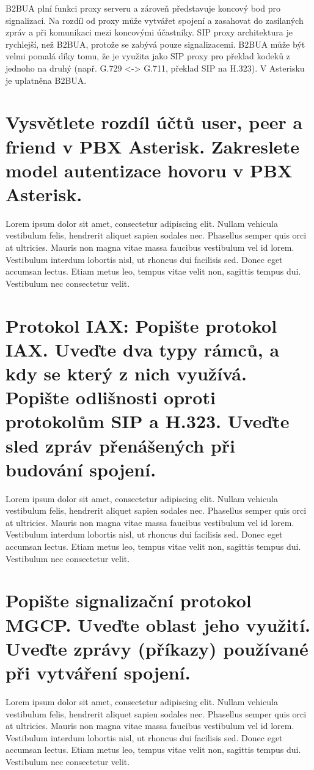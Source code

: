B2BUA plní funkci proxy serveru a zároveň představuje koncový bod pro signalizaci. Na rozdíl od proxy může vytvářet spojení a zasahovat do zasílaných zpráv a při komunikaci mezi koncovými účastníky. SIP proxy architektura je rychlejší, než B2BUA, protože se zabývá pouze signalizacemi. B2BUA může být velmi pomalá díky tomu, že je využita jako SIP proxy pro překlad kodeků z jednoho na druhý (např. G.729 <-> G.711, překlad SIP na H.323). V Asterisku je uplatněna B2BUA.

\section{Vysvětlete rozdíl účtů user, peer a friend v PBX Asterisk. Zakreslete model autentizace hovoru v PBX Asterisk.}

Lorem ipsum dolor sit amet, consectetur adipiscing elit. Nullam vehicula vestibulum felis, hendrerit aliquet sapien sodales nec. Phasellus semper quis orci at ultricies. Mauris non magna vitae massa faucibus vestibulum vel id lorem. Vestibulum interdum lobortis nisl, ut rhoncus dui facilisis sed. Donec eget accumsan lectus. Etiam metus leo, tempus vitae velit non, sagittis tempus dui. Vestibulum nec consectetur velit.

\section{Protokol IAX: Popište protokol IAX. Uveďte dva typy rámců, a kdy se který z nich využívá. Popište odlišnosti oproti protokolům SIP a H.323. Uveďte sled zpráv přenášených při budování spojení.}

Lorem ipsum dolor sit amet, consectetur adipiscing elit. Nullam vehicula vestibulum felis, hendrerit aliquet sapien sodales nec. Phasellus semper quis orci at ultricies. Mauris non magna vitae massa faucibus vestibulum vel id lorem. Vestibulum interdum lobortis nisl, ut rhoncus dui facilisis sed. Donec eget accumsan lectus. Etiam metus leo, tempus vitae velit non, sagittis tempus dui. Vestibulum nec consectetur velit.

\section{Popište signalizační protokol MGCP. Uveďte oblast jeho využití. Uveďte zprávy (příkazy) používané při vytváření spojení.}

Lorem ipsum dolor sit amet, consectetur adipiscing elit. Nullam vehicula vestibulum felis, hendrerit aliquet sapien sodales nec. Phasellus semper quis orci at ultricies. Mauris non magna vitae massa faucibus vestibulum vel id lorem. Vestibulum interdum lobortis nisl, ut rhoncus dui facilisis sed. Donec eget accumsan lectus. Etiam metus leo, tempus vitae velit non, sagittis tempus dui. Vestibulum nec consectetur velit.

